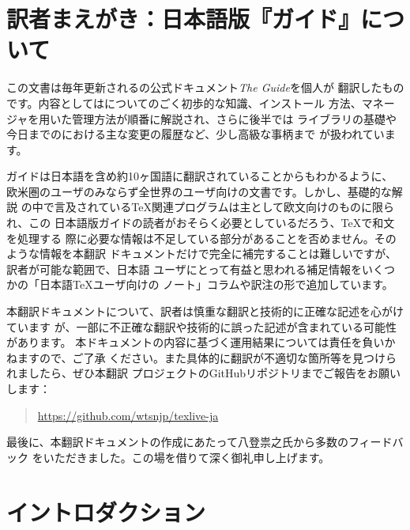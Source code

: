 \documentclass[uplatex,dvipdfmx,12pt,tombow]{jsarticle}
\date{2026年3月}
\begin{document}
\maketitle
\thispagestyle{empty}

\tableofcontents

\section*{訳者まえがき：日本語版『\TL ガイド』について}

この文書は毎年更新される\TL の公式ドキュメント\textsl{The {\TL} Guide}を個人が
翻訳したものです。内容としては\TL についてのごく初歩的な知識、インストール
方法、\TL マネージャを用いた\TL 管理方法が順番に解説され、さらに後半では\KPS
ライブラリの基礎や今日までの\TL における主な変更の履歴など、少し高級な事柄まで
が扱われています。

\TL ガイドは日本語を含め約10ヶ国語に翻訳されていることからもわかるように、
欧米圏のユーザのみならず全世界の\TL ユーザ向けの文書です。しかし、基礎的な解説
の中で言及されている\TeX 関連プログラムは主として欧文向けのものに限られ、この
日本語版\TL ガイドの読者がおそらく必要としているだろう、\TeX で和文を処理する
際に必要な情報は不足している部分があることを否めません。そのような情報を本翻訳
ドキュメントだけで完全に補完することは難しいですが、訳者が可能な範囲で、日本語
ユーザにとって有益と思われる補足情報をいくつかの「日本語\TeX ユーザ向けの
ノート」コラムや訳注の形で追加しています。

本翻訳ドキュメントについて、訳者は慎重な翻訳と技術的に正確な記述を心がけています
が、一部に不正確な翻訳や技術的に誤った記述が含まれている可能性があります。
本ドキュメントの内容に基づく運用結果については責任を負いかねますので、ご了承
ください。また具体的に翻訳が不適切な箇所等を見つけられましたら、ぜひ本翻訳
プロジェクトのGitHubリポジトリまでご報告をお願いします：
%
\begin{quote}
\url{https://github.com/wtsnjp/texlive-ja}
\end{quote}

最後に、本翻訳ドキュメントの作成にあたって八登祟之氏から多数のフィードバック
をいただきました。この場を借りて深く御礼申し上げます。

\section{イントロダクション}\label{sec:intro}

\subsection{\TL}
\end{document}
